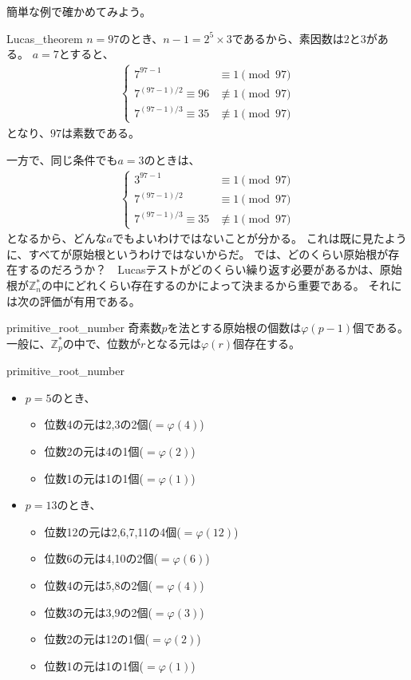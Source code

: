 簡単な例で確かめてみよう。

\begin{Exam}{}{Lucas_theorem}
$n=97$のとき、$n-1=2^5\times3$であるから、素因数は$2$と$3$がある。
$a=7$とすると、
\begin{align*}
\begin{cases}
7^{97-1} &\equiv 1 \pmod{97}\\
7^{(97-1)/2}  \equiv 96 &\not\equiv 1 \pmod{97}\\
7^{(97-1)/3}  \equiv 35 &\not\equiv 1 \pmod{97}
\end{cases}
\end{align*}
となり、$97$は素数である。
\end{Exam}

一方で、同じ条件でも$a=3$のときは、
\begin{align*}
\begin{cases}
3^{97-1} &\equiv 1 \pmod{97}\\
7^{(97-1)/2}  &\equiv 1 \pmod{97}\\
7^{(97-1)/3}  \equiv 35 &\not\equiv 1 \pmod{97}
\end{cases}
\end{align*}
となるから、どんな$a$でもよいわけではないことが分かる。
これは既に見たように、すべてが原始根というわけではないからだ。
では、どのくらい原始根が存在するのだろうか？　Lucasテストがどのくらい繰り返す必要があるかは、原始根が$\mathbb{Z}_n^*$の中にどれくらい存在するのかによって決まるから重要である。
それには次の評価が有用である。

\begin{Prop}{}{primitive_root_number}
奇素数$p$を法とする原始根の個数は$\varphi(p-1)$個である。
一般に、$\mathbb{Z}_p^*$の中で、位数が$r$となる元は$\varphi(r)$個存在する。
\end{Prop}

\begin{Exam}{}{primitive_root_number}\;
\begin{itemize}
 \item $p=5$のとき、
  \begin{itemize}
   \item 位数4の元は2,3の2個($=\varphi(4)$)
   \item 位数2の元は4の1個($=\varphi(2)$)
   \item 位数1の元は1の1個($=\varphi(1)$)
  \end{itemize}
  \item $p=13$のとき、
  \begin{itemize}
   \item 位数12の元は2,6,7,11の4個($=\varphi(12)$)
   \item 位数6の元は4,10の2個($=\varphi(6)$)
   \item 位数4の元は5,8の2個($=\varphi(4)$)
   \item 位数3の元は3,9の2個($=\varphi(3)$)
   \item 位数2の元は12の1個($=\varphi(2)$)
   \item 位数1の元は1の1個($=\varphi(1)$)
  \end{itemize}
\end{itemize}
\end{Exam}

